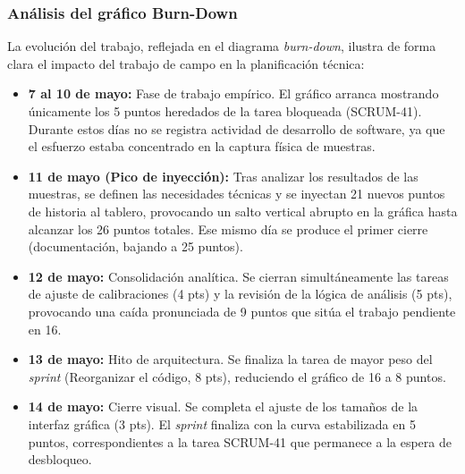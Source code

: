 \subsubsection{Análisis del gráfico Burn-Down}

La evolución del trabajo, reflejada en el diagrama \textit{burn-down}, ilustra de forma clara el impacto del trabajo de campo en la planificación técnica:

\begin{itemize}
    \item \textbf{7 al 10 de mayo:} Fase de trabajo empírico. El gráfico arranca mostrando únicamente los 5 puntos heredados de la tarea bloqueada (SCRUM-41). Durante estos días no se registra actividad de desarrollo de software, ya que el esfuerzo estaba concentrado en la captura física de muestras.
    \item \textbf{11 de mayo (Pico de inyección):} Tras analizar los resultados de las muestras, se definen las necesidades técnicas y se inyectan 21 nuevos puntos de historia al tablero, provocando un salto vertical abrupto en la gráfica hasta alcanzar los 26 puntos totales. Ese mismo día se produce el primer cierre (documentación, bajando a 25 puntos).
    \item \textbf{12 de mayo:} Consolidación analítica. Se cierran simultáneamente las tareas de ajuste de calibraciones (4 pts) y la revisión de la lógica de análisis (5 pts), provocando una caída pronunciada de 9 puntos que sitúa el trabajo pendiente en 16.
    \item \textbf{13 de mayo:} Hito de arquitectura. Se finaliza la tarea de mayor peso del \textit{sprint} (Reorganizar el código, 8 pts), reduciendo el gráfico de 16 a 8 puntos.
    \item \textbf{14 de mayo:} Cierre visual. Se completa el ajuste de los tamaños de la interfaz gráfica (3 pts). El \textit{sprint} finaliza con la curva estabilizada en 5 puntos, correspondientes a la tarea SCRUM-41 que permanece a la espera de desbloqueo.
\end{itemize}


